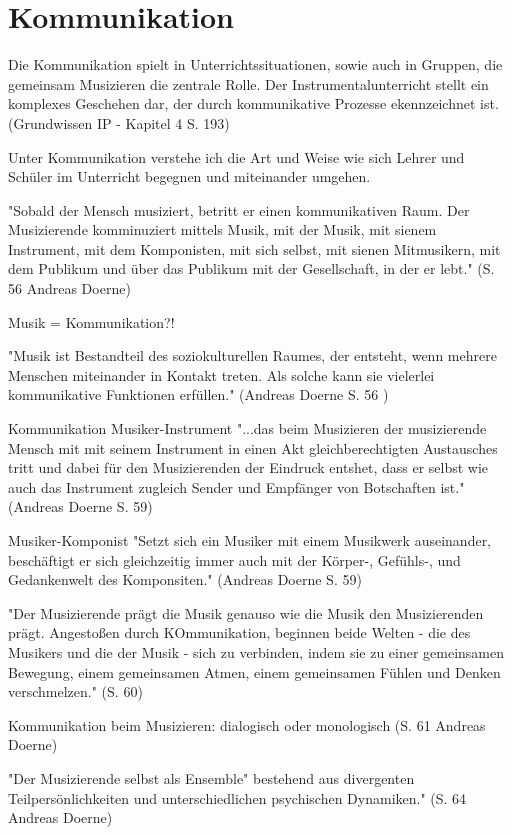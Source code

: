 \section{Kommunikation}

Die Kommunikation spielt in Unterrichtssituationen, sowie auch in Gruppen, die
gemeinsam Musizieren die zentrale Rolle. Der Instrumentalunterricht stellt ein komplexes Geschehen dar, der
durch
kommunikative Prozesse ekennzeichnet ist. (Grundwissen IP - Kapitel 4 S. 193)

Unter Kommunikation verstehe ich die Art und Weise wie sich Lehrer und Schüler
im Unterricht begegnen und miteinander umgehen. 

"Sobald der Mensch musiziert, betritt er einen kommunikativen Raum. Der
Musizierende komminuziert mittels Musik, mit der Musik, mit sienem Instrument,
mit dem Komponisten, mit sich selbst, mit sienen Mitmusikern, mit dem Publikum
und über das Publikum mit der Gesellschaft, in der er lebt." (S. 56 Andreas
Doerne)

Musik = Kommunikation?! 

"Musik ist Bestandteil des soziokulturellen Raumes, der entsteht, wenn mehrere
Menschen miteinander in Kontakt treten. Als solche kann sie vielerlei
kommunikative Funktionen erfüllen." (Andreas Doerne S. 56 )

Kommunikation Musiker-Instrument
"...das beim Musizieren der musizierende Mensch mit mit seinem Instrument in
einen Akt gleichberechtigten Austausches tritt und dabei für den Musizierenden
der Eindruck entshet, dass er selbst wie auch das Instrument zugleich Sender und
Empfänger von Botschaften ist." (Andreas Doerne S. 59)


Musiker-Komponist
"Setzt sich ein Musiker mit einem Musikwerk auseinander, beschäftigt er sich
gleichzeitig immer auch mit der Körper-, Gefühls-, und Gedankenwelt des
Komponsiten." (Andreas Doerne S. 59)

"Der Musizierende prägt die Musik genauso wie die Musik den Musizierenden prägt.
Angestoßen durch KOmmunikation, beginnen beide Welten - die des Musikers und die
der Musik - sich zu verbinden, indem sie zu einer gemeinsamen Bewegung, einem
gemeinsamen Atmen, einem gemeinsamen Fühlen und Denken verschmelzen." (S. 60)

Kommunikation beim Musizieren: dialogisch oder monologisch (S. 61 Andreas Doerne)


"Der Musizierende selbst als Ensemble" bestehend aus divergenten Teilpersönlichkeiten und
unterschiedlichen psychischen Dynamiken." (S. 64 Andreas Doerne)

